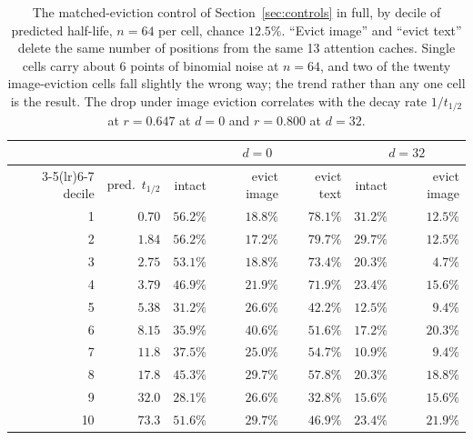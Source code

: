 \documentclass{article}
\begin{document}
\begin{table}[h]
\centering\small
\begin{tabular}{rrrrrrr}
\toprule
& & \multicolumn{3}{c}{$d = 0$} & \multicolumn{2}{c}{$d = 32$} \\
\cmidrule(lr){3-5}\cmidrule(lr){6-7}
decile & pred.\ $t_{1/2}$ & intact & evict image & evict text & intact & evict image \\
\midrule
1  & $0.70$ & $56.2\%$ & $18.8\%$ & $78.1\%$ & $31.2\%$ & $12.5\%$ \\
2  & $1.84$ & $56.2\%$ & $17.2\%$ & $79.7\%$ & $29.7\%$ & $12.5\%$ \\
3  & $2.75$ & $53.1\%$ & $18.8\%$ & $73.4\%$ & $20.3\%$ & $4.7\%$  \\
4  & $3.79$ & $46.9\%$ & $21.9\%$ & $71.9\%$ & $23.4\%$ & $15.6\%$ \\
5  & $5.38$ & $31.2\%$ & $26.6\%$ & $42.2\%$ & $12.5\%$ & $9.4\%$  \\
6  & $8.15$ & $35.9\%$ & $40.6\%$ & $51.6\%$ & $17.2\%$ & $20.3\%$ \\
7  & $11.8$ & $37.5\%$ & $25.0\%$ & $54.7\%$ & $10.9\%$ & $9.4\%$  \\
8  & $17.8$ & $45.3\%$ & $29.7\%$ & $57.8\%$ & $20.3\%$ & $18.8\%$ \\
9  & $32.0$ & $28.1\%$ & $26.6\%$ & $32.8\%$ & $15.6\%$ & $15.6\%$ \\
10 & $73.3$ & $51.6\%$ & $29.7\%$ & $46.9\%$ & $23.4\%$ & $21.9\%$ \\
\bottomrule
\end{tabular}
\caption{The matched-eviction control of Section~\ref{sec:controls} in full, by
decile of predicted half-life, $n = 64$ per cell, chance $12.5\%$. ``Evict
image'' and ``evict text'' delete the same number of positions from the same 13
attention caches. Single cells carry about $6$ points of binomial noise at
$n = 64$, and two of the twenty image-eviction cells fall slightly the wrong
way; the trend rather than any one cell is the result. The drop under image
eviction correlates with the decay rate $1/t_{1/2}$ at $r = 0.647$ at $d{=}0$
and $r = 0.800$ at $d{=}32$.}
\label{tab:controls_full}
\end{table}
\end{document}
